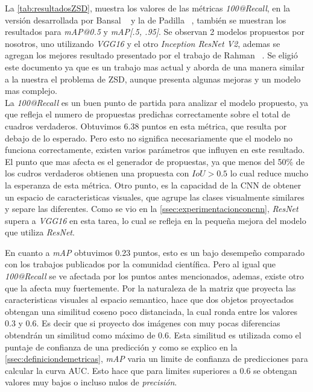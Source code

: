 La \autoref{tab:resultadosZSD}, muestra los valores de las métricas \textit{100@Recall}, en la versión desarrollada por Bansal \etal~\cite{bansal2018zero} y la de Padilla \etal~\cite{padilla2020survey}, también se muestran los resultados para \textit{mAP@0.5} y \textit{mAP[.5, .95]}. Se observan 2 modelos propuestos por nosotros, uno utilizando \textit{VGG16} y el otro \textit{Inception ResNet V2}, ademas se agregan los mejores resultado presentado por el trabajo de Rahman \etal~\cite{rahman2020zero}. Se eligió este documento ya que es un trabajo mas actual y aborda de una manera similar a la nuestra el problema de ZSD, aunque presenta algunas mejoras y un modelo mas complejo.\\

La \textit{100@Recall} es un buen punto de partida para analizar el modelo propuesto, ya que refleja el numero de propuestas predichas correctamente sobre el total de cuadros verdaderos. Obtuvimos 6.38 puntos en esta métrica, que resulta por debajo de lo esperado. Pero esto no significa necesariamente que el modelo no funciona correctamente, existen varios parámetros que influyen en este resultado. El punto que mas afecta es el generador de propuestas, ya que menos del 50\% de los cudros verdaderos obtienen una propuesta con $IoU > 0.5$ lo cual reduce mucho la esperanza de esta métrica. Otro punto, es la capacidad de la CNN de obtener un espacio de caracteristicas visuales, que agrupe las clases visualmente similares y separe las diferentes. Como se vio en la \autoref{ssec:experimentacionconcnn}, \textit{ResNet} supera a \textit{VGG16} en esta tarea, lo cual se refleja en la pequeña mejora del modelo que utiliza  \textit{ResNet}.

En cuanto a \textit{mAP} obtuvimos 0.23 puntos, esto es un bajo desempeño comparado con los trabajos publicados por la comunidad científica. Pero al igual que \textit{100@Recall} se ve afectada por los puntos antes mencionados, ademas, existe otro que la afecta muy fuertemente. Por la naturaleza de la matriz que proyecta las caracteristicas visuales al espacio semantico, hace que dos objetos proyectados obtengan una similitud coseno poco distanciada, la cual ronda entre los valores 0.3 y 0.6. Es decir que si proyecto dos imágenes con muy pocas diferencias obtendrán un similitud como máximo de 0.6. Esta similitud es utilizada como el puntaje de confianza de una predicción y como se explico en la \autoref{ssec:definiciondemetricas}, \textit{mAP} varia un limite de confianza de predicciones para calcular la curva AUC. Esto hace que para limites superiores a 0.6 se obtengan valores muy bajos o incluso nulos de \textit{precisión}.\\
 

